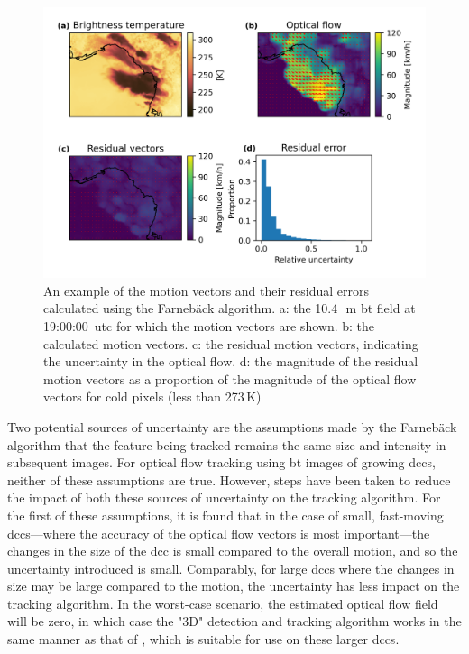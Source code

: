 \begin{figure}[tp]
    \includegraphics[width=\textwidth]{figures/chapter1_14.png}
    \caption[
    An example of the motion vectors and their residual errors calculated using the Farnebäck algorithm
    ]{
    An example of the motion vectors and their residual errors calculated using the Farnebäck algorithm. a: the 10.4\,\unit{\mu m} \acrshort{bt} field at 19:00:00~\acrshort{utc} for which the motion vectors are shown. b: the calculated motion vectors. c: the residual motion vectors, indicating the uncertainty in the optical flow. d: the magnitude of the residual motion vectors as a proportion of the magnitude of the optical flow vectors for cold pixels (less than 273\,\unit{K})
    }
    \label{fig:optical_flow}
\end{figure}


Two potential sources of uncertainty are the assumptions made by the Farnebäck algorithm that the feature being tracked remains the same size and intensity in subsequent images.
For optical flow tracking using \acrshort{bt} images of growing \acrshort{dcc}s, neither of these assumptions are true.
However, steps have been taken to reduce the impact of both these sources of uncertainty on the tracking algorithm.
For the first of these assumptions, it is found that in the case of small, fast-moving \acrshort{dcc}s---where the accuracy of the optical flow vectors is most important---the changes in the size of the \acrshort{dcc} is small compared to the overall motion, and so the uncertainty introduced is small.
Comparably, for large \acrshort{dcc}s where the changes in size may be large compared to the motion, the uncertainty has less impact on the tracking algorithm.
In the worst-case scenario, the estimated optical flow field will be zero, in which case the "3D" detection and tracking algorithm works in the same manner as that of \citet{fiolleau_algorithm_2013}, which is suitable for use on these larger \acrshort{dcc}s.

